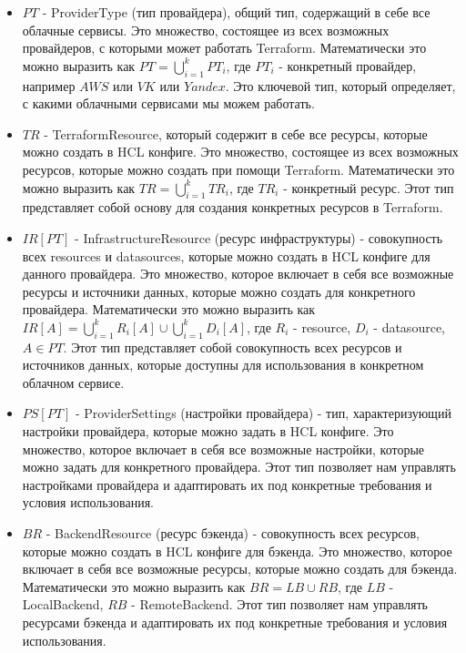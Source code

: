 \begin{itemize}
\item $PT$ - ProviderType (тип провайдера), общий тип, содержащий в себе все
облачные сервисы. Это множество, состоящее из всех возможных провайдеров, с
которыми может работать Terraform. Математически это можно выразить как $PT =
\bigcup_{i=1}^{k}{PT_i}$, где $PT_i$ - конкретный провайдер, например $AWS$ или
$VK$ или $Yandex$. Это ключевой тип, который определяет, с какими облачными
сервисами мы можем работать.

\item $TR$ - TerraformResource, который содержит в себе все ресурсы, которые
можно создать в HCL конфиге. Это множество, состоящее из всех возможных
ресурсов, которые можно создать при помощи Terraform. Математически это можно
выразить как $TR = \bigcup_{i=1}^{k}{TR_i}$, где $TR_i$ - конкретный ресурс.
Этот тип представляет собой основу для создания конкретных ресурсов в Terraform.

\item $IR[PT]$ - InfrastructureResource (ресурс инфраструктуры) - совокупность
всех resources и datasources, которые можно создать в HCL конфиге для данного
провайдера. Это множество, которое включает в себя все возможные ресурсы и
источники данных, которые можно создать для конкретного провайдера.
Математически это можно выразить как $IR[A] = \bigcup_{i=1}^{k}{R_i[A]} \cup
\bigcup_{i=1}^{k}{D_i[A]}$, где $R_i$ - resource, $D_i$ - datasource, $A \in
PT$. Этот тип представляет собой совокупность всех ресурсов и источников данных,
которые доступны для использования в конкретном облачном сервисе.

\item $PS[PT]$ - ProviderSettings (настройки провайдера) - тип, характеризующий
настройки провайдера, которые можно задать в HCL конфиге. Это множество, которое
включает в себя все возможные настройки, которые можно задать для конкретного
провайдера. Этот тип позволяет нам управлять настройками провайдера и
адаптировать их под конкретные требования и условия использования.

\item $BR$ - BackendResource (ресурс бэкенда) - совокупность всех ресурсов,
которые можно создать в HCL конфиге для бэкенда. Это множество, которое включает
в себя все возможные ресурсы, которые можно создать для бэкенда. Математически
это можно выразить как $BR = LB \cup RB$, где $LB$ - LocalBackend, $RB$ -
RemoteBackend. Этот тип позволяет нам управлять ресурсами бэкенда и адаптировать
их под конкретные требования и условия использования.


\end{itemize}
